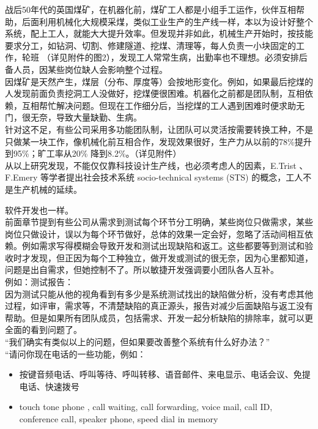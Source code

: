 战后50年代的英国煤矿，在机器化前，煤矿工人都是小组手工运作，伙伴互相帮助，后面利用机械化大规模采煤，类似工业生产的生产线一样，本以为设计好整个系统，配上工人，就能大大提升效率。但发现并非如此，机械生产开始时，按技能要求分工，如钻洞、切割、修建隧道、挖煤、清理等，每人负责一小块固定的工作，轮班
（详见附件的图2），发现工人常常生病，出勤率也不理想。必须安排后备人员，因某些岗位缺人会影响整个过程。\\
因煤矿是天然产生，煤层（分布、厚度等）会按地形变化。例如，如果最后挖煤的人发现前面负责挖洞工人没做好，挖煤便很困难。机器化之前都是团队制，互相依赖，互相帮忙解决问题。但现在工作细分后，当挖煤的工人遇到困难时便求助无门，很无奈，导致大量缺勤、生病。\\
针对这不足，有些公司采用多功能团队制，让团队可以灵活按需要转换工种，不是只做某一块工作，像机械化前互相合作，发现效果很好，生产力从以前的78\%提升到95\%；旷工率从20\%
降到8.2\%。（详见附件）\\
从以上研究发现，不能仅仅靠科技设计生产线，也必须考虑人的因素，E.Trist
、F.Emery 等学者提出社会技术系统 socio-technical systems (STS)
的概念，工人不是生产机械的延续。


软件开发也一样。\\
前面章节提到有些公司从需求到测试每个环节分工明确，某些岗位只做需求，某些岗位只做设计，误以为每个环节做好，总体的效果一定会好，忽略了活动间相互依赖。例如需求写得模糊会导致开发和测试出现缺陷和返工。这些都要等到测试和验收时才发现，但正因为每个工种独立，做开发或测试的很无奈，因为心里都知道，问题是出自需求，但她控制不了。所以敏捷开发强调要小团队各人互补。\\
例如：测试报告：\\
因为测试只能从他的视角看到有多少是系统测试找出的缺陷做分析，没有考虑其他过程，如评审，需求等，不清楚缺陷的真正源头，报告对减少后面缺陷与返工没有帮助。但是如果所有团队成员，包括需求、开发一起分析缺陷的排除率，就可以更全面的看到问题了。\\
``我们确实有类似以上的问题，但如果要改善整个系统有什么好办法？''\\
``请问你现在电话的一些功能，例如：

\begin{itemize}
\tightlist
\item
  按键音频电话、呼叫等待、呼叫转移、语音邮件、来电显示、电话会议、免提电话、快速拨号
\item
  touch tone phone , call waiting, call forwarding, voice mail, call ID,
  conference call, speaker phone, speed dial in memory\\
\end{itemize}

